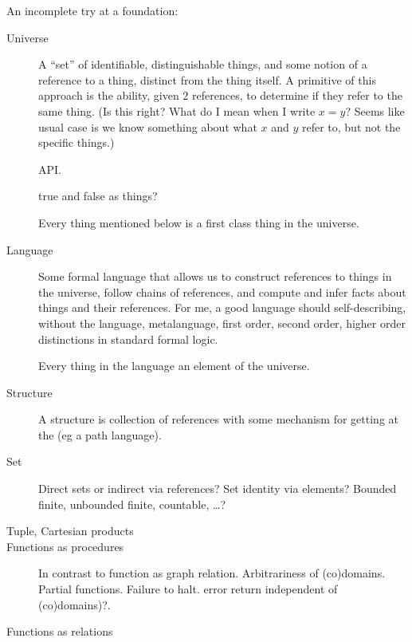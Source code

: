 \documentclass[11pt,openany]{article}
\begin{document}
An incomplete try at a foundation:
\begin{description}

\item[Universe] A ``set'' of identifiable, distinguishable
things,
and some notion of a reference to a thing, distinct from the thing
itself.
A primitive of this approach is the ability, given $2$ references,
to determine if they refer to the same thing.
(Is this right? What do I mean when I write $x=y$?
Seems like usual case is we know something about what $x$ and $y$
refer to, but not the specific things.)
\par
API. 
\par
\textsf{true} and \textsf{false} as things?
\par
Every thing mentioned below is a first class thing in the universe.

\item[Language] Some formal language that allows us 
to construct references to things in the universe, 
follow chains of references, and compute and infer facts 
about things and their references. 
For me, a good language should self-describing, without the
language, metalanguage, first order, second order, higher order 
distinctions in standard formal logic.
\par
Every thing in the language an element of the universe.

\item[Structure] A structure is collection of references with
some mechanism for getting at the (eg a path language).

\item[Set] Direct sets or indirect via references?
Set identity via elements?
Bounded finite, unbounded finite, countable, \ldots ?

\item[Tuple, Cartesian products]

\item[Functions as procedures]
In contrast to function as graph relation.
Arbitrariness of (co)domains. Partial functions. Failure to halt.
error return independent of (co)domains)?.

\item[Functions as relations]
\end{description}
\end{document}
